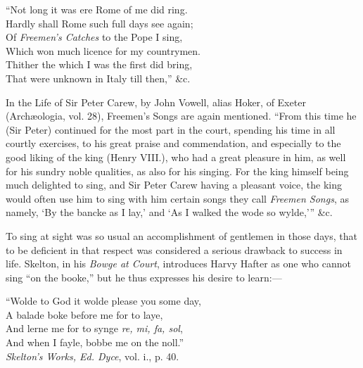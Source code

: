 \settowidth{\versewidth}{Which won much licence for my countrymen.}
\begin{scverse}
“Not long it was ere Rome of me did ring.\\
Hardly shall Rome such full days see again;\\
Of \textit{Freemen's Catches} to the Pope I sing,\\
Which won much licence for my countrymen.\\
Thither the which I was the first did bring,\\
That were unknown in Italy till then,” \&c.
\end{scverse}

In the Life of Sir Peter Carew, by John Vowell, alias Hoker, of Exeter
(Archæo\-logia, vol. 28), Freemen’s Songs are again mentioned. “From this time
he (Sir Peter) continued for the most part in the court, spending his time in
all courtly exercises, to his great praise and commendation, and especially to the
good liking of the king (Henry VIII.), who had a great pleasure in him, as
well for his sundry noble qualities, as also for his singing. For the king himself
being much delighted to sing, and Sir Peter Carew having a pleasant voice, the
king would often use him to sing with him certain songs they call \textit{Freemen Songs},
as namely, ‘By the bancke as I lay,’ and ‘As I walked the wode so wylde,’” \&c.

To sing at sight was so usual an accomplishment of gentlemen in those days,
that to be deficient in that respect was considered a serious drawback to success in
life. Skelton, in his \textit{Bowge at Court}, introduces Harvy Hafter as one who cannot
sing “on the booke,” but he thus expresses his desire to learn:—
\settowidth{\versewidth}{“Wolde to God it wolde please you some day,}
\begin{scverse}
“Wolde to God it wolde please you some day,\\
A balade boke before me for to laye,\\
And lerne me for to synge \textit{re, mi, fa, sol},\\
And when I fayle, bobbe me on the noll.”\\
\hfill\textit{Skelton’s Works, Ed. Dyce}, vol. i., p. 40.\hspace*{4em}
\end{scverse}
\pagebreak

